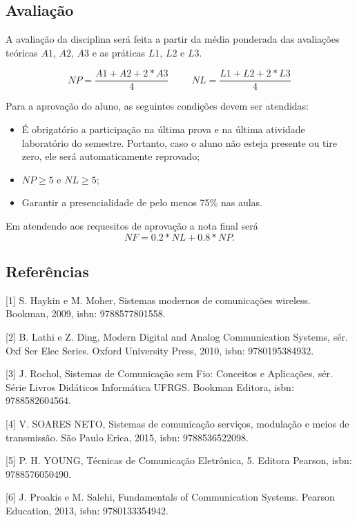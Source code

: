   \begin{snugshade}
  \section{Avaliação}
  \end{snugshade}
  
  A avaliação da disciplina será feita a partir da média ponderada das avaliações teóricas $A1$, $A2$, $A3$ e as práticas $L1$, $L2$ e $L3$.
  

  \begin{equation*}
      NP =  \frac{A1 + A2 + 2*A3}{4} \hspace{1cm} NL =  \frac{L1 + L2 + 2*L3}{4}
  \end{equation*}
  
  Para a aprovação do aluno, as seguintes condições devem ser atendidas:
    \begin{itemize}
      \item É obrigatório a participação na última prova e na última atividade laboratório do semestre. Portanto, caso o aluno não esteja presente ou tire zero, ele será automaticamente reprovado;
      \item $ NP \geq 5 $ e $ NL \geq 5 $;
      \item Garantir a presencialidade de pelo menos 75\% nas aulas.
    \end{itemize}
  Em atendendo  aos requesitos de aprovação a nota final será
  $$
  NF = 0.2*NL + 0.8*NP.
  $$
 
  
   \newpage 
  \begin{snugshade}
    \section{Referências}
\end{snugshade}

[1] S. Haykin e M. Moher, Sistemas modernos de comunicações wireless. Bookman, 2009, isbn: 9788577801558.


[2] B. Lathi e Z. Ding, Modern Digital and Analog Communication Systems, sér. Oxf Ser Elec Series. Oxford University Press, 2010, isbn: 9780195384932.


[3] J. Rochol, Sistemas de Comunicação sem Fio: Conceitos e Aplicações, sér. Série Livros Didáticos Informática UFRGS. Bookman Editora, isbn: 9788582604564.


[4] V. SOARES NETO, Sistemas de comunicação serviços, modulação e meios de transmissão. São Paulo Erica, 2015, isbn: 9788536522098.


[5] P. H. YOUNG, Técnicas de Comunicação Eletrônica, 5. Editora Pearson, isbn: 9788576050490.


[6] J. Proakis e M. Salehi, Fundamentals of Communication Systems. Pearson Education, 2013, isbn: 9780133354942.